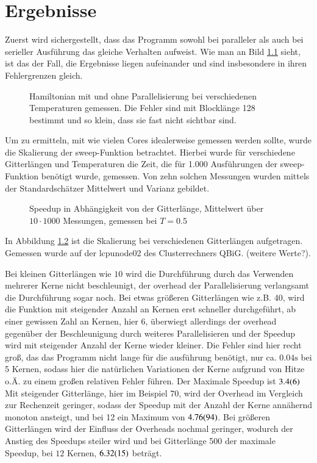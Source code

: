 	\chapter{Ergebnisse}
	\label{chap:ergebnisse}
	
	Zuerst wird sichergestellt, dass das Programm sowohl bei paralleler als auch bei serieller Ausführung das gleiche Verhalten aufweist. Wie man an Bild \ref{fig:vergleichham} sieht, ist das der Fall, die Ergebnisse liegen aufeinander und sind insbesondere in ihren Fehlergrenzen gleich.
	
	\begin{figure}[htbp]
		
		\caption[Hamiltonian mit und ohne Parallelisierung]{Hamiltonian mit und ohne Parallelisierung bei verschiedenen Temperaturen gemessen. Die Fehler sind mit Blocklänge 128 bestimmt und so klein, dass sie fast nicht sichtbar sind.}
		\label{fig:vergleichham}
	\end{figure}
	
	Um zu ermitteln, mit wie vielen Cores idealerweise gemessen werden sollte, wurde die Skalierung der sweep-Funktion betrachtet. Hierbei wurde für verschiedene Gitterlängen und Temperaturen die Zeit, die für 1.000 Ausführungen der sweep-Funktion benötigt wurde, gemessen. Von zehn solchen Messungen wurden mittels der Standardschätzer Mittelwert und Varianz gebildet. 
	
	\begin{figure}[htbp]
		
		\caption[Speedup in Abhängigkeit von der Gitterlänge]{Speedup in Abhängigkeit von der Gitterlänge, Mittelwert über $10 \cdot 1000$ Messungen, gemessen bei $T=\num{0,5}$}
		\label{fig:skalierunglaenge}
	\end{figure}
	
	In Abbildung \ref{fig:skalierunglaenge} ist die Skalierung bei verschiedenen Gitterlängen aufgetragen. Gemessen wurde auf der lcpunode02 des Clusterrechners QBiG. (weitere Werte?).
	
	Bei kleinen Gitterlängen wie $10$ wird die Durchführung durch das Verwenden mehrerer Kerne nicht beschleunigt, der overhead der Parallelisierung verlangsamt die Durchführung sogar noch. Bei etwas größeren Gitterlängen wie z.{}B.{} 40, wird die Funktion mit steigender Anzahl an Kernen erst schneller durchgeführt, ab einer gewissen Zahl an Kernen, hier $6$, überwiegt allerdings der overhead gegenüber der Beschleunigung durch weiteres Parallelisieren und der Speedup wird mit steigender Anzahl der Kerne wieder kleiner. Die Fehler sind hier recht groß, das das Programm nicht lange für die ausführung benötigt, nur ca.{} $\num{0,04}\si{\second}$ bei 5 Kernen, sodass hier die natürlichen Variationen der Kerne aufgrund von Hitze o.{}Ä.{} zu einem großen relativen Fehler führen. Der Maximale Speedup ist $\num{3,4\pm0,6}$ Mit steigender Gitterlänge, hier im Beispiel 70, wird der Overhead im Vergleich zur Rechenzeit geringer, sodass der Speedup mit der Anzahl der Kerne annähernd monoton ansteigt, und bei 12 ein Maximum von $\num{4,76\pm0,94}$.
	Bei größeren Gitterlängen wird der Einfluss der Overheads nochmal geringer, wodurch der Anstieg des Speedups steiler wird und bei Gitterlänge 500 der maximale Speedup, bei $12$ Kernen, $\num{6,32\pm0,15}$ beträgt.
 	
